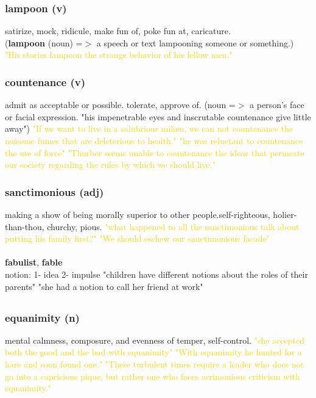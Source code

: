 \documentclass{proc}
\begin{document}
	\subsubsection{\textcolor{brickred}{lampoon} (v)}
	satirize,
	mock,
	ridicule,
	make fun of,
	poke fun at,
	caricature.\\
	(\textbf{lampoon} (noun) =$>$ a speech or text lampooning someone or something.)
	\textcolor{gold}{"His stories lampoon the strange behavior of his fellow men."}
	
	\subsubsection{\textcolor{brickred}{countenance} (v)}
	admit as acceptable or possible. tolerate, approve of.
	(noun =$>$ a person's face or facial expression. "his impenetrable eyes and inscrutable countenance give little away")
	\textcolor{gold}{"If we want to live in a salubrious milieu, we can not countenance the noisome fumes that are deleterious to health." "he was reluctant to countenance the use of force" "Thurber seems unable to countenance the ideas that permeate our society regarding the rules by which we should live."}
	
	\subsubsection{\textcolor{brickred}{sanctimonious} (adj)}
	making a show of being morally superior to other people.self-righteous,
	holier-than-thou,
	churchy, pious.
	\textcolor{gold}{"what happened to all the sanctimonious talk about putting his family first?" "We should eschew our sanctimonious facade"}\\\\
	\textbf{fabulist}, \textbf{fable}\\
	notion: 1- idea 2- impulse "children have different notions about the roles of their parents" "she had a notion to call her friend at work"
	
	\newpage
	\subsection{}
	\subsubsection{\textcolor{brickred}{equanimity} (n)}
	mental calmness, composure, and evenness of temper, self-control.
	\textcolor{gold}{"she accepted both the good and the bad with equanimity" "With equanimity he hunted for a hare and soon found one." "These turbulent times require a leader who does not go into a capricious pique, but rather one who faces acrimonious criticism with equanimity."}
	
\end{document}
